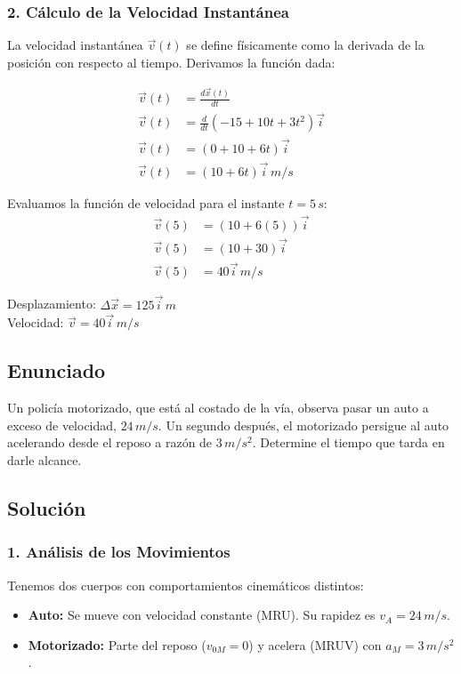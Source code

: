 \documentclass[12pt, a4paper]{article}
\begin{document}
\subsubsection*{2. Cálculo de la Velocidad Instantánea}
La velocidad instantánea $\vec{v}(t)$ se define físicamente como la derivada de la posición con respecto al tiempo. Derivamos la función dada:

\begin{align*}
\vec{v}(t) &= \frac{d\vec{x}(t)}{dt} \\
\vec{v}(t) &= \frac{d}{dt} (-15 + 10t + 3t^2)\vec{i} \\
\vec{v}(t) &= (0 + 10 + 6t)\vec{i} \\
\vec{v}(t) &= (10 + 6t)\vec{i} \, \si{m/s}
\end{align*}

Evaluamos la función de velocidad para el instante $t = 5 \, \si{s}$:
\begin{align*}
\vec{v}(5) &= (10 + 6(5))\vec{i} \\
\vec{v}(5) &= (10 + 30)\vec{i} \\
\vec{v}(5) &= 40\vec{i} \, \si{m/s}
\end{align*}

\begin{tcolorbox}[colback=green!5!white, colframe=green!50!black, title=Respuesta Final]
\centering
Desplazamiento: $\Delta\vec{x} = 125\vec{i} \, \si{m}$ \\
Velocidad: $\vec{v} = 40\vec{i} \, \si{m/s}$
\end{tcolorbox}

\newpage

\subsection*{Enunciado}
Un policía motorizado, que está al costado de la vía, observa pasar un auto a exceso de velocidad, $24 \, \si{m/s}$. Un segundo después, el motorizado persigue al auto acelerando desde el reposo a razón de $3 \, \si{m/s^2}$. Determine el tiempo que tarda en darle alcance.

\subsection*{Solución}

\subsubsection*{1. Análisis de los Movimientos}
Tenemos dos cuerpos con comportamientos cinemáticos distintos:
\begin{itemize}
\item \textbf{Auto:} Se mueve con velocidad constante (MRU). Su rapidez es $v_A = 24 \, \si{m/s}$.
\item \textbf{Motorizado:} Parte del reposo ($v_{0M} = 0$) y acelera (MRUV) con $a_M = 3 \, \si{m/s^2}$.
\end{itemize}
\end{document}
